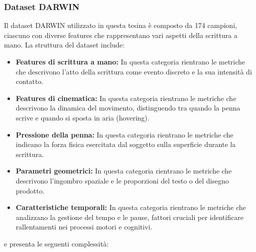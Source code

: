 \documentclass[11pt,a4paper]{article}
\begin{document}
\subsubsection{Dataset DARWIN}
Il dataset DARWIN utilizzato in questa tesina è composto da 174 campioni, ciascuno con diverse features che rappresentano vari aspetti della scrittura a mano.
La struttura del dataset include:
\begin{itemize}
  \item \textbf{Features di scrittura a mano:} In questa categoria rientrano le metriche che descrivono l'atto della scrittura come evento discreto e la sua intensità di contatto.
  \item \textbf{Features di cinematica:} In questa categoria rientrano le metriche che descrivono la dinamica del movimento, distinguendo tra quando la penna scrive e quando si sposta in aria (hovering).
  \item \textbf{Pressione della penna:} In questa categoria rientrano le metriche che indicano la forza fisica esercitata dal soggetto sulla superficie durante la scrittura.
  \item \textbf{Parametri geometrici:} In questa categoria rientrano le metriche che descrivono l'ingombro spaziale e le proporzioni del testo o del disegno prodotto.
  \item \textbf{Caratteristiche temporali:} In questa categoria rientrano le metriche che analizzano la gestione del tempo e le pause, fattori cruciali per identificare rallentamenti nei processi motori e cognitivi.
\end{itemize}
e presenta le seguenti complessità:
\end{document}
